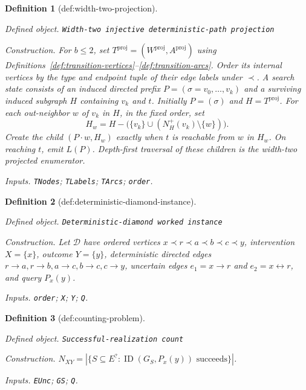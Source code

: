 \documentclass{article}
\newtheorem{definition}{Definition}
\begin{document}
\begin{definition}[def:width-two-projection]\label{def:width-two-projection}
\par\smallskip\noindent\emph{Defined object.} \texttt{Width-\allowbreak{}two injective deterministic-\allowbreak{}path projection}
\par\smallskip\noindent\emph{Construction.} For \(b\le2\), set \(T^{\mathrm{proj}}=(W^{\mathrm{proj}},A^{\mathrm{proj}})\) using Definitions~\ref{def:transition-vertices}--\ref{def:transition-arcs}.  Order its internal vertices by the type and endpoint tuple of their edge labels under \(\prec\).  A search state consists of an induced directed prefix \(P=(\sigma=v_0,\ldots,v_k)\) and a surviving induced subgraph \(H\) containing \(v_k\) and \(t\).  Initially \(P=(\sigma)\) and \(H=T^{\mathrm{proj}}\).  For each out-neighbor \(w\) of \(v_k\) in \(H\), in the fixed order, set
\[
 H_w=H-\bigl(\{v_k\}\cup(N_H^+(v_k)\setminus\{w\})\bigr).
\]
Create the child \((P\cdot w,H_w)\) exactly when \(t\) is reachable from \(w\) in \(H_w\).  On reaching \(t\), emit \(L(P)\).  Depth-first traversal of these children is the width-two projected enumerator.
\par\smallskip\noindent\emph{Inputs.} \texttt{TNodes}; \texttt{TLabels}; \texttt{TArcs}; \texttt{order}.
\end{definition}

\begin{definition}[def:deterministic-diamond-instance]\label{def:deterministic-diamond-instance}
\par\smallskip\noindent\emph{Defined object.} \texttt{Deterministic-\allowbreak{}diamond worked instance}
\par\smallskip\noindent\emph{Construction.} Let \(\mathcal D\) have ordered vertices \(x\prec r\prec a\prec b\prec c\prec y\), intervention \(X=\{x\}\), outcome \(Y=\{y\}\), deterministic directed edges \(r\to a,r\to b,a\to c,b\to c,c\to y\), uncertain edges \(e_1=x\to r\) and \(e_2=x\leftrightarrow r\), and query \(P_x(y)\).
\par\smallskip\noindent\emph{Inputs.} \texttt{order}; \texttt{X}; \texttt{Y}; \texttt{Q}.
\end{definition}

\begin{definition}[def:counting-problem]\label{def:counting-problem}
\par\smallskip\noindent\emph{Defined object.} \texttt{Successful-\allowbreak{}realization count}
\par\smallskip\noindent\emph{Construction.} \(N_{XY}=|\{S\subseteq E^{?}:\operatorname{ID}(G_S,P_x(y))\text{ succeeds}\}|\).
\par\smallskip\noindent\emph{Inputs.} \texttt{EUnc}; \texttt{GS}; \texttt{Q}.
\end{definition}
\end{document}
